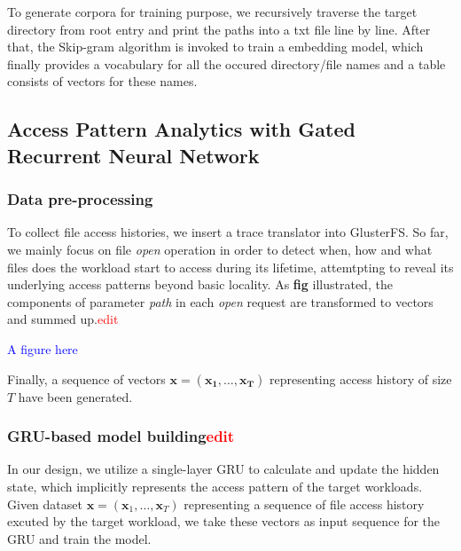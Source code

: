 \documentclass[conference]{IEEEtran}
\begin{document}
To generate corpora for training purpose,
we recursively traverse the target directory from root entry and print the paths into a txt file line by line.
After that, the Skip-gram algorithm is invoked to train a embedding model, 
which finally provides a vocabulary for all the occured directory/file names and a table consists of vectors for these names.


\subsection{Access Pattern Analytics with Gated Recurrent Neural Network}
\subsubsection{Data pre-processing}
To collect file access histories, we insert a trace translator into GlusterFS.
So far, we mainly focus on file \textit{open} operation in order to detect when, how and what files does the workload start to access during its lifetime,
attemtpting to reveal its underlying access patterns beyond basic locality. 
As \textbf{fig} illustrated, the components of parameter \textit{path} in each \textit{open} request are transformed to vectors and summed up.\textcolor{red}{edit} 

\textcolor{blue}{A figure here}

Finally, a sequence of vectors $\mathbf{x}=(\mathbf{x_1}, \dots, \mathbf{x_T})$ representing access history of size $T$ have been generated.

\subsubsection{GRU-based model building\textcolor{red}{edit}}
In our design, we utilize a single-layer GRU to calculate and update the hidden state, which implicitly represents the access pattern of the target workloads. 
Given dataset $\mathbf{x} = (\mathbf{x}_1,\dots,\mathbf{x}_T)$ representing a sequence of file access history excuted by the target workload, 
we take these vectors as input sequence for the GRU and train the model. 
\end{document}
